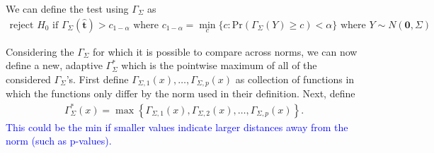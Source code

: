 \documentclass{article}
\newcommand{\vmat}{\Sigma}
\newcommand{\norm}{f}
\newcommand{\disto}{P}
\newcommand{\tst}{\hat{\boldsymbol{t}}}
\newcommand{\rvv}{Z}
\newcommand{\distv}{Q}
\newcommand{\Gammaf}{\Gamma_{\Sigma}}
\begin{document}

We can define the test using $\Gammaf$ as 
\begin{align*}
	\text{reject } H_0 \text{ if } \Gammaf(\tst) > c_{1 - \alpha} \text { where } c_{1 - \alpha} = \min_{c}\{c : \text{Pr}(\Gammaf(Y) \geq c) < \alpha\} \text{ where } Y \sim N(\boldsymbol{0}, \Sigma)
\end{align*}

Considering the $\Gammaf$ for which it is possible to compare across norms, we can now define a new, adaptive $\Gammaf^*$ which is the pointwise maximum of all of the considered $\Gammaf$'s. First define $\Gamma_{\Sigma, 1}(x), \dots, \Gamma_{\Sigma, p}(x)$ as collection of functions in which the functions only differ by the norm used in their definition. Next, define
\begin{align*}
	\Gammaf^*(x) = \max\left\{\Gamma_{\Sigma, 1}(x), \Gamma_{\Sigma, 2}(x), \dots, \Gamma_{\Sigma, p}(x)\right\}.
\end{align*}
\textcolor{blue}{This could be the min if smaller values indicate larger distances away from the norm (such as p-values).}  
\end{document}
